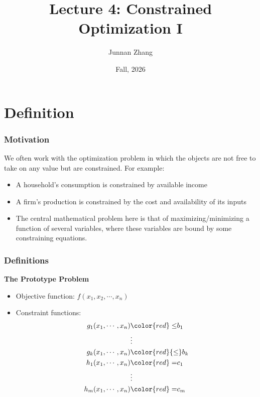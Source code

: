 \documentclass[9pt,aspectratio=169]{beamer}
\title[Lecture 4: Constrained Optimization I]{Lecture 4: Constrained
  Optimization I}
\author{Junnan Zhang} %
\institute[Paula and Gregory Chow Institute for Studies in Economics\\
Xiamen University] %
{
	Paula and Gregory Chow Institute for Studies in Economics \\ Xiamen University  \\ %
	\medskip
    \textit{Slides Prepared by Xiaoling Mei}
}
\date{Fall, 2026} %
\begin{document}
\begin{frame}
\titlepage %
\end{frame}

\section{Definition}
\begin{frame}
    \frametitle{Motivation}

    We often work with the optimization problem in which the objects are not
    free to take on any value but are constrained. For example:
    \begin{itemize}
        \item A household's consumption is constrained by available income
        \item A firm's production is constrained by the cost and availability
        of its inputs
        \item The central mathematical problem here is that of
        maximizing/minimizing a function of several variables, where these
        variables are bound by some constraining equations.
    \end{itemize}
\end{frame}		
		

\begin{frame}
	\frametitle{Definitions}
	\begin{block}{\textbf{The Prototype Problem}}
	\begin{itemize}
		\item Objective function: $f(x_1,x_2,\cdots,x_n)$
		\item Constraint functions: 
		\begin{align}
		g_1(x_1,\cdots,x_n) &{\color{red}\leq} b_1 \nonumber \\
		& \vdots \nonumber \\
		g_k(x_1,\cdots,x_n) &{\color{red}{\leq}} b_k \nonumber \\ 
		h_1(x_1,\cdots,x_n) &{\color{red} =} c_1 \nonumber \\
		& \vdots \nonumber \\
		h_m(x_1,\cdots,x_n) &{\color{red} =} c_m \nonumber 
		\end{align}
	\end{itemize}
	\end{block}
\end{frame}	
\end{document}
